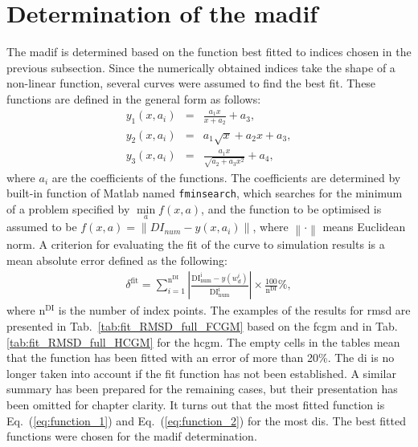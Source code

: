 \section{Determination of the \acs{madif}}
\label{sec:determination}

The \ac{madif} is determined based on the function best fitted to indices chosen in the previous subsection.
Since the numerically obtained indices take the shape of a non-linear function, several curves were assumed to find the best fit.
These functions are defined in the general form as follows:
\begin{eqnarray}
	y_1(x,a_i) & = & \frac{a_1x}{x+a_2}+a_3,
	\label{eq:function_1}\\
	y_2(x,a_i) & = & a_1\sqrt{x} + a_2x+a_3,
	\label{eq:function_2}\\
	y_3(x,a_i) & = & \frac{a_1x}{\sqrt{a_2 + a_3x^2}}+a_4,\label{eq:function_3} 
\end{eqnarray}
where \(a_i\) are the coefficients of the functions.
The coefficients are determined by built-in function of Matlab named \verb+fminsearch+, which searches for the minimum of a problem specified by \(\min\limits_a f(x,a)\), and the function to be optimised is assumed to be \(f(x,a)=\left\|DI_{num} - y(x,a_i)\right\|\), where \(\left\|\cdot\right\|\) means Euclidean norm.
A criterion for evaluating the fit of the curve to simulation results is a mean absolute error defined as the following:
\begin{eqnarray}
	\delta^{\mathrm{fit}} = \sum_{i=1}^{\mathrm{n^{DI}}} \left|\frac{\mathrm{DI^i_{num}}-y(w_d^i)}{\mathrm{DI^i_{num}}}\right|\times\frac{100}{\mathrm{n^{DI}}}\%,
\end{eqnarray}
where \(\mathrm{n^{DI}}\) is the number of index points.
The examples of the results for \ac{rmsd} are presented in Tab.~\ref{tab:fit_RMSD_full_FCGM} based on the \ac{fcgm} and in Tab. \ref{tab:fit_RMSD_full_HCGM} for the \ac{hcgm}.
The empty cells in the tables mean that the function has been fitted with an error of more than 20\%.
The \ac{di} is no longer taken into account if the fit function has not been established.
A similar summary has been prepared for the remaining cases, but their presentation has been omitted for chapter clarity.
It turns out that the most fitted function is Eq.~(\ref{eq:function_1}) and Eq.~(\ref{eq:function_2}) for the most \acp{di}.
The best fitted functions were chosen for the \ac{madif} determination.

